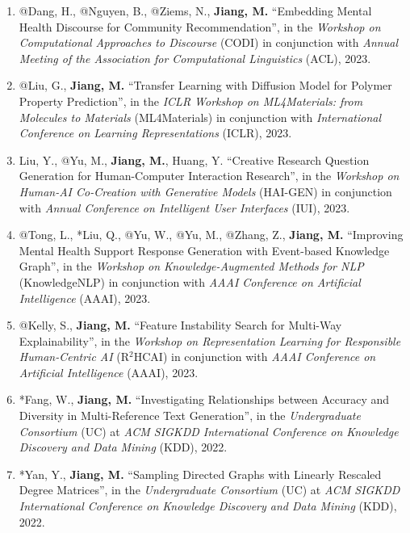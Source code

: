 \documentclass[10pt]{article}
\newenvironment{myindentpar}[1]%
{\begin{list}{}%
         {\setlength{\leftmargin}{#1}}%
         \item[]%
}
{\end{list}}
\newcounter{list}
\begin{document}
\begin{myindentpar}{0.00cm}
\begin{enumerate}[leftmargin=.5cm]
\item[W25] @Dang, H., @Nguyen, B., @Ziems, N., \textbf{Jiang, M.} ``Embedding Mental Health Discourse for Community Recommendation'', in the \textit{Workshop on Computational Approaches to Discourse} (CODI) in conjunction with \textit{Annual Meeting of the Association for Computational Linguistics} (ACL), 2023.

\item[W24] @Liu, G., \textbf{Jiang, M.} ``Transfer Learning with Diffusion Model for Polymer Property Prediction'', in the \textit{ICLR Workshop on ML4Materials: from Molecules to Materials} (ML4Materials) in conjunction with \textit{International Conference on Learning Representations} (ICLR), 2023.

\item[W23] Liu, Y., @Yu, M., \textbf{Jiang, M.}, Huang, Y. ``Creative Research Question Generation for Human-Computer Interaction Research'', in the \textit{Workshop on Human-AI Co-Creation with Generative Models} (HAI-GEN) in conjunction with \textit{Annual Conference on Intelligent User Interfaces} (IUI), 2023.

\item[W22] @Tong, L., *Liu, Q., @Yu, W., @Yu, M., @Zhang, Z., \textbf{Jiang, M.} ``Improving Mental Health Support Response Generation with Event-based Knowledge Graph'', in the \textit{Workshop on Knowledge-Augmented Methods for NLP} (KnowledgeNLP) in conjunction with \textit{AAAI Conference on Artificial Intelligence} (AAAI), 2023.

\item[W21] @Kelly, S., \textbf{Jiang, M.} ``Feature Instability Search for Multi-Way Explainability'', in the \textit{Workshop on Representation Learning for Responsible Human-Centric AI} (R$^2$HCAI) in conjunction with \textit{AAAI Conference on Artificial Intelligence} (AAAI), 2023.

\item[W20] *Fang, W., \textbf{Jiang, M.} ``Investigating Relationships between Accuracy and Diversity in Multi-Reference Text Generation'', in the \textit{Undergraduate Consortium} (UC) at \textit{ACM SIGKDD International Conference on Knowledge Discovery and Data Mining} (KDD), 2022.

\item[W19] *Yan, Y., \textbf{Jiang, M.} ``Sampling Directed Graphs with Linearly Rescaled Degree Matrices'', in the \textit{Undergraduate Consortium} (UC) at \textit{ACM SIGKDD International Conference on Knowledge Discovery and Data Mining} (KDD), 2022.


\end{enumerate}
\end{myindentpar}
\end{document}

